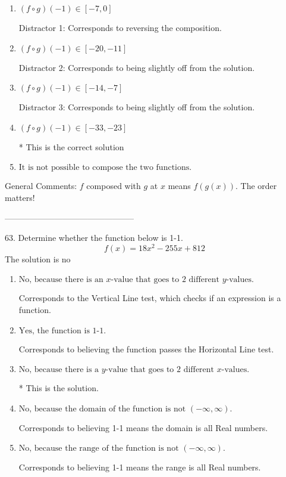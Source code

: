 \documentclass{extbook}[14pt]
\begin{document}
\begin{enumerate}[label=\Alph*.] 
\item $ (f \circ g)(-1) \in [-7, 0] $ 

  Distractor 1: Corresponds to reversing the composition. 
\item $ (f \circ g)(-1) \in [-20, -11] $ 

  Distractor 2: Corresponds to being slightly off from the solution. 
\item $ (f \circ g)(-1) \in [-14, -7] $ 

  Distractor 3: Corresponds to being slightly off from the solution. 
\item $ (f \circ g)(-1) \in [-33, -23] $ 

 * This is the correct solution 
\item $ \text{It is not possible to compose the two functions.} $ 

  
\end{enumerate} 
 
General Comments: $f$ composed with $g$ at $x$ means $f(g(x))$. The order matters!

-----------------------------------------------

63. Determine whether the function below is 1-1.
\[ f(x) = 18 x^2 - 255 x + 812 \] 
The solution is $ \text{no} $ 

\begin{enumerate}[label=\Alph*.] 
\item $ \text{No, because there is an $x$-value that goes to 2 different $y$-values.} $ 

 Corresponds to the Vertical Line test, which checks if an expression is a function. 
\item $ \text{Yes, the function is 1-1.} $ 

 Corresponds to believing the function passes the Horizontal Line test. 
\item $ \text{No, because there is a $y$-value that goes to 2 different $x$-values.} $ 

 * This is the solution. 
\item $ \text{No, because the domain of the function is not $(-\infty, \infty)$.} $ 

 Corresponds to believing 1-1 means the domain is all Real numbers. 
\item $ \text{No, because the range of the function is not $(-\infty, \infty)$.} $ 

 Corresponds to believing 1-1 means the range is all Real numbers. 
\end{enumerate} 
 
\end{document}
